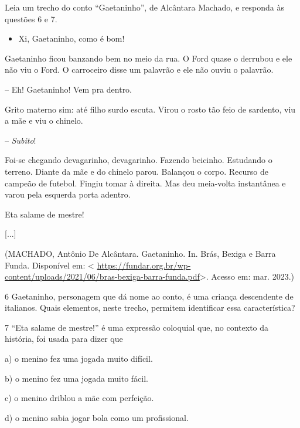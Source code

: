 {Leia um trecho do conto ``Gaetaninho'', de Alcântara Machado, e responda
às questões 6 e 7.

\begin{itemize}
\tightlist
\item
  Xi, Gaetaninho, como é bom!
\end{itemize}

Gaetaninho ficou banzando bem no meio da rua. O Ford quase o derrubou e
ele não viu o Ford. O carroceiro disse um palavrão e ele não ouviu o
palavrão.

-- Eh! Gaetaninho! Vem pra dentro.

Grito materno sim: até filho surdo escuta. Virou o rosto tão feio de
sardento, viu a mãe e viu o chinelo.

-- \emph{Subito}!

Foi-se chegando devagarinho, devagarinho. Fazendo beicinho. Estudando o
terreno. Diante da mãe e do chinelo parou. Balançou o corpo. Recurso de
campeão de futebol. Fingiu tomar à direita. Mas deu meia-volta
instantânea e varou pela esquerda porta adentro.

Eta salame de mestre!

{[}...{]}

(MACHADO, Antônio De Alcântara. Gaetaninho. In. Brás, Bexiga e Barra
Funda. Disponível em: \textless{}
\url{https://fundar.org.br/wp-content/uploads/2021/06/bras-bexiga-barra-funda.pdf}\textgreater.
Acesso em: mar. 2023.)

\num{6} Gaetaninho, personagem que dá nome ao conto, é uma criança
descendente de italianos. Quais elementos, neste trecho, permitem
identificar essa característica?



\num{7} ``Eta salame de mestre!'' é uma expressão coloquial que, no
contexto da história, foi usada para dizer que

a) o menino fez uma jogada muito difícil.

b) o menino fez uma jogada muito fácil.

c) o menino driblou a mãe com perfeição.

d) o menino sabia jogar bola como um profissional.


}
